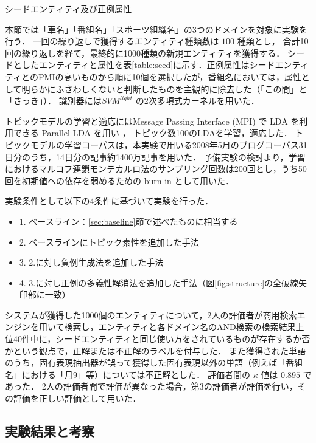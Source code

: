 \documentclass[japanese]{jnlp_1.4}
\begin{document}
\begin{table}[b]
\caption{シードエンティティ及び正例属性}
\label{table:seed}

\end{table}


本節では「車名」「番組名」「スポーツ組織名」の3つのドメインを対象に実験を行う．
一回の繰り返しで獲得するエンティティ種類数は $100$ 種類とし， 合計10回の繰り返しを経て，最終的に1000種類の新規エンティティを獲得する．
シードとしたエンティティと属性を表\ref{table:seed}に示す．正例属性はシードエンティティとのPMIの高いものから順に10個を選択したが，番組名においては，属性として明らかにふさわしくないと判断したものを主観的に除去した（「この間」と「さっき」）．
識別器には$SVM^{light}$ \cite{joachims1999making} の2次多項式カーネルを用いた．


トピックモデルの学習と適応にはMessage Passing Interface (MPI) で LDA を利用できる Parallel LDA を用い \cite{liu2011plda}，
トピック数100のLDAを学習，適応した．
トピックモデルの学習コーパスは，本実験で用いる2008年5月のブログコーパス31日分のうち，14日分の記事約1400万記事を用いた．
予備実験の検討より，学習におけるマルコフ連鎖モンテカルロ法のサンプリング回数は200回とし，うち50回を初期値への依存を弱めるための burn-in として用いた．



実験条件として以下の4条件に基づいて実験を行った．
\begin{itemize}
\item{1. ベースライン：\ref{sec:baseline}節で述べたものに相当する}
\item{2. ベースラインにトピック素性を追加した手法}
\item{3. 2.に対し負例生成法を追加した手法}
\item{4. 3.に対し正例の多義性解消法を追加した手法（図\ref{fig:structure}の全破線矢印部に一致）}
\end{itemize}
システムが獲得した1000個のエンティティについて，2人の評価者が商用検索エンジンを用いて検索し，エンティティと各ドメイン名のAND検索の検索結果上位40件中に，シードエンティティと同じ使い方をされているものが存在するか否かという観点で，正解または不正解のラベルを付与した．
また獲得された単語のうち，固有表現抽出器が誤って獲得した固有表現以外の単語（例えば「番組名」における「月9」等）については不正解とした．
評価者間の $\kappa$ 値は $0.895$ であった． 
2人の評価者間で評価が異なった場合，第3の評価者が評価を行い，その評価を正しい評価として用いた．


\subsection{実験結果と考察}
\end{document}
